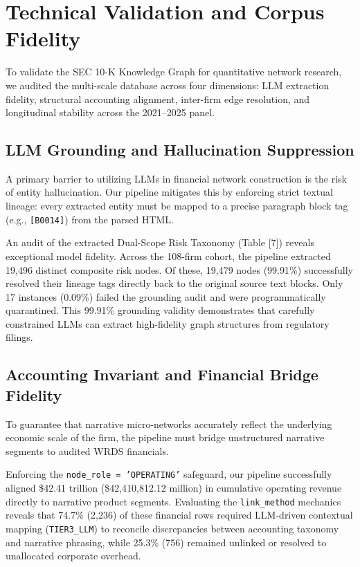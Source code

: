 \section{Technical Validation and Corpus Fidelity}
\label{sec:validation}

To validate the SEC 10-K Knowledge Graph for quantitative network research, we audited the multi-scale database across four dimensions: LLM extraction fidelity, structural accounting alignment, inter-firm edge resolution, and longitudinal stability across the 2021--2025 panel.



\subsection{LLM Grounding and Hallucination Suppression}
A primary barrier to utilizing LLMs in financial network construction is the risk of entity hallucination. Our pipeline mitigates this by enforcing strict textual lineage: every extracted entity must be mapped to a precise paragraph block tag (e.g., \texttt{[B0014]}) from the parsed HTML. 

An audit of the extracted Dual-Scope Risk Taxonomy (Table [7]) reveals exceptional model fidelity. Across the 108-firm cohort, the pipeline extracted 19,496 distinct composite risk nodes. Of these, 19,479 nodes (99.91\%) successfully resolved their lineage tags directly back to the original source text blocks. Only 17 instances (0.09\%) failed the grounding audit and were programmatically quarantined. This 99.91\% grounding validity demonstrates that carefully constrained LLMs can extract high-fidelity graph structures from regulatory filings.

\subsection{Accounting Invariant and Financial Bridge Fidelity}
To guarantee that narrative micro-networks accurately reflect the underlying economic scale of the firm, the pipeline must bridge unstructured narrative segments to audited WRDS financials. 

Enforcing the \texttt{node\_role = 'OPERATING'} safeguard, our pipeline successfully aligned \$42.41 trillion (\$42,410,812.12 million) in cumulative operating revenue directly to narrative product segments. Evaluating the \texttt{link\_method} mechanics reveals that 74.7\% (2,236) of these financial rows required LLM-driven contextual mapping (\texttt{TIER3\_LLM}) to reconcile discrepancies between accounting taxonomy and narrative phrasing, while 25.3\% (756) remained unlinked or resolved to unallocated corporate overhead. 


